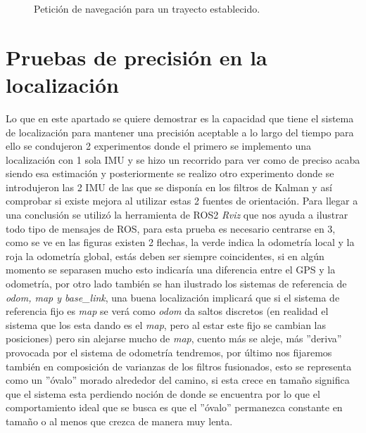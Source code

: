 \begin{figure}[htbp]
\begin{minipage}[b]{0.45\textwidth}
    \caption{Petición de navegación para un trayecto establecido.}
    \label{fig:peticion_camino}
  \end{minipage}
\end{figure}

\section{Pruebas de precisión en la localización}

Lo que en este apartado se quiere demostrar es la capacidad que tiene el sistema de localización para mantener una precisión aceptable a lo 
largo del tiempo para ello se condujeron 2 experimentos donde el primero se implemento una localización con 1 sola IMU y se hizo un recorrido para ver como de preciso acaba siendo esa estimación 
y posteriormente se realizo otro experimento donde se introdujeron las 2 IMU de las que se disponía en los filtros de Kalman y así comprobar si existe mejora al 
utilizar estas 2 fuentes de orientación. Para llegar a una conclusión se utilizó la herramienta de ROS2 \textit{Rviz} que nos ayuda a 
ilustrar todo tipo de mensajes de ROS, para esta prueba es necesario centrarse en 3, como se ve en las figuras existen 2 flechas, la verde indica la odometría local y la roja la odometría global, estás deben ser siempre 
coincidentes, si en algún momento se separasen mucho esto indicaría una diferencia entre el GPS y la odometría, por otro lado también se han 
ilustrado los sistemas de referencia de \textit{odom, map y base\_link}, una buena localización implicará que si el sistema de referencia fijo es \textit{map} 
se verá como \textit{odom} da saltos discretos (en realidad el sistema que los esta dando es el \textit{map}, pero al estar este fijo se cambian las posiciones) pero 
sin alejarse mucho de \textit{map}, cuento más se aleje, más ''deriva'' provocada por el sistema de odometría tendremos, por último nos fijaremos también en 
composición de varianzas de los filtros fusionados, esto se representa como un ''óvalo'' morado alrededor del camino, si esta crece en tamaño significa que el sistema 
esta perdiendo noción de donde se encuentra por lo que el comportamiento ideal que se busca es que el ''óvalo'' permanezca constante en tamaño o al menos que 
crezca de manera muy lenta.


